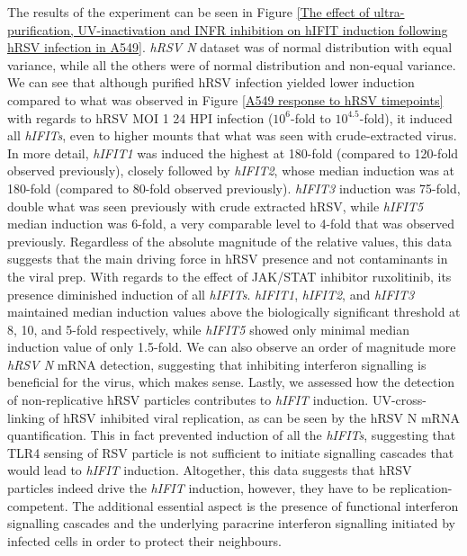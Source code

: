 The results of the experiment can be seen in Figure \ref{The effect of ultra-purification, UV-inactivation and INFR inhibition on hIFIT induction following hRSV infection in A549}. \textit{hRSV N} dataset was of normal distribution with equal variance, while all the others were of normal distribution and non-equal variance. We can see that although purified hRSV infection yielded lower induction compared to what was observed in Figure \ref{A549 response to hRSV timepoints} with regards to hRSV MOI 1 24 HPI infection (\(10^6\)-fold to \(10^{4.5}\)-fold), it induced all \textit{hIFITs}, even to higher mounts that what was seen with crude-extracted virus. In more detail, \textit{hIFIT1} was induced the highest at 180-fold (compared to 120-fold observed previously), closely followed by \textit{hIFIT2}, whose median induction was at 180-fold (compared to 80-fold observed previously). \textit{hIFIT3} induction was 75-fold, double what was seen previously with crude extracted hRSV, while \textit{hIFIT5} median induction was 6-fold, a very comparable level to 4-fold that was observed previously. Regardless of the absolute magnitude of the relative values, this data suggests that the main driving force in hRSV presence and not contaminants in the viral prep. With regards to the effect of JAK/STAT inhibitor ruxolitinib, its presence diminished induction of all \textit{hIFITs}. \textit{hIFIT1}, \textit{hIFIT2}, and \textit{hIFIT3} maintained median induction values above the biologically significant threshold at 8, 10, and 5-fold respectively, while \textit{hIFIT5} showed only minimal median induction value of only 1.5-fold. We can also observe an order of magnitude more \textit{hRSV N} mRNA detection, suggesting that inhibiting interferon signalling is beneficial for the virus, which makes sense. Lastly, we assessed how the detection of non-replicative hRSV particles contributes to \textit{hIFIT} induction. UV-cross-linking of hRSV inhibited viral replication, as can be seen by the {hRSV N} mRNA quantification. This in fact prevented induction of all the \textit{hIFITs}, suggesting that TLR4 sensing of RSV particle is not sufficient to initiate signalling cascades that would lead to \textit{hIFIT} induction. Altogether, this data suggests that hRSV particles indeed drive the \textit{hIFIT} induction, however, they have to be replication-competent. The additional essential aspect is the presence of functional interferon signalling cascades and the underlying paracrine interferon signalling initiated by infected cells in order to protect their neighbours.

